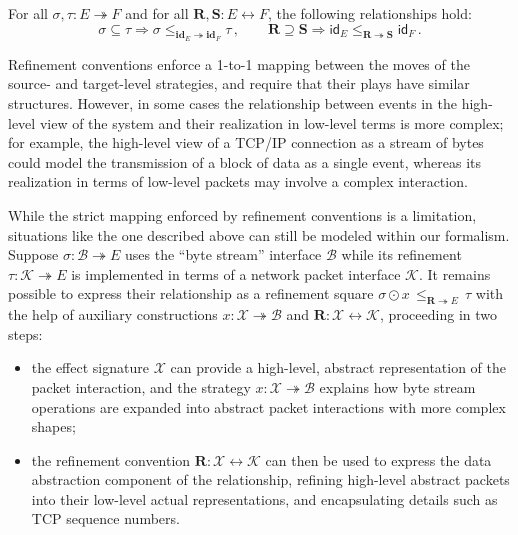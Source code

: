\documentclass[acmsmall,nonacm]{acmart}
\newcommand{\kw}[1]{\ensuremath{ \mathsf{#1} }}
\newcommand{\idsc}{\mathbf{id}} %
\begin{document}
\begin{theorem}
For all $\sigma, \tau : E \twoheadrightarrow F$ and
for all $\mathbf{R}, \mathbf{S} : E \leftrightarrow F$,
the following relationships hold:
\[
  \sigma \subseteq \tau \Rightarrow
  \sigma \le_{\idsc_E \twoheadrightarrow \idsc_F} \tau
  \,,
  \qquad
  \mathbf{R} \supseteq \mathbf{S} \Rightarrow
  \kw{id}_E \le_{\mathbf{R} \twoheadrightarrow \mathbf{S}} \kw{id}_F
  \,.
\]
\end{theorem}

\begin{remark}%
Refinement conventions enforce a 1-to-1 mapping between
the moves of the source- and target-level strategies,
and require that their plays have similar structures.
However, in some cases
the relationship between events in the high-level view of the system
and their realization in low-level terms is more complex;
for example,
the high-level view of a TCP/IP connection as a stream of bytes
could model the transmission of a block of data as a single event,
whereas its realization in terms of low-level packets
may involve a complex interaction.

While the strict mapping enforced by refinement conventions
is a limitation,
situations like the one described above
can still be modeled within our formalism.
Suppose $\sigma : \mathcal{B} \twoheadrightarrow E$
uses the ``byte stream'' interface $\mathcal{B}$
while its refinement
$\tau : \mathcal{K} \twoheadrightarrow E$
is implemented in terms of
a network packet interface $\mathcal{K}$.
It remains possible to express their relationship
as a refinement square
$
  \sigma \odot x \, \le_{\mathbf{R} \twoheadrightarrow E} \, \tau
$
with the help of auxiliary constructions
$x : \mathcal{X} \twoheadrightarrow \mathcal{B}$ and
$\mathbf{R} : \mathcal{X} \leftrightarrow \mathcal{K}$,
proceeding in two steps:
\begin{itemize}
  \item the effect signature $\mathcal{X}$ can provide
    a high-level, abstract representation of the packet interaction,
    and the strategy $x : \mathcal{X} \twoheadrightarrow \mathcal{B}$
    explains how byte stream operations are expanded into
    abstract packet interactions with more complex shapes;
  \item the refinement convention
    $\mathbf{R} : \mathcal{X} \leftrightarrow \mathcal{K}$
    can then be used to express the data abstraction component of
    the relationship, refining high-level abstract packets into
    their low-level actual representations,
    and encapsulating details such as TCP sequence numbers.
\end{itemize}
\end{remark}
\end{document}
